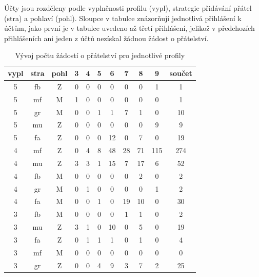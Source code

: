 \documentclass[thesis=M,czech]{FITthesis}[2013/05/10]
\begin{document}
\begin{table}[h]
	\centering
	\caption{Vývoj počtu žádostí o přátelství pro jednotlivé profily}\label{tab:friendRequestsCount}
	Účty jsou rozděleny podle vyplněnosti profilu (vypl), strategie přidávání přátel (stra) a pohlaví (pohl). Sloupce v tabulce znázorňují jednotlivá přihlášení k účtům, jako první je v tabulce uvedeno až třetí přihlášení, jelikož v předchozích přihlášeních ani jeden z účtů nezískal žádnou žádost o přátelství.
	
    \begin{tabular}{ccc | ccccccc | c}
    \textbf{vypl} & \textbf{stra} & \textbf{pohl} & \textbf{3} & \textbf{4} & \textbf{5} & \textbf{6} & \textbf{7} & \textbf{8} & \textbf{9} & \textbf{součet} \\ \hline
    5          & fb        & Z       & 0   & 0   & 0   & 0   & 0   & 0   & 1   & 1   \\
    5          & mf        & M       & 1   & 0   & 0   & 0   & 0   & 0   & 0   & 1   \\
    5          & gr        & M       & 0   & 0   & 1   & 1   & 7   & 1   & 0   & 10  \\
    5          & mu        & Z       & 0   & 0   & 0   & 0   & 0   & 0   & 9   & 9   \\
    5          & fa        & Z       & 0   & 0   & 0   & 12  & 0   & 7   & 0   & 19  \\
    4          & mf        & Z       & 0   & 4   & 8   & 48  & 28  & 71  & 115 & 274 \\
    4          & mu        & Z       & 3   & 3   & 1   & 15  & 7   & 17  & 6   & 52  \\
    4          & fb        & M       & 0   & 0   & 0   & 0   & 0   & 2   & 0   & 2   \\
    4          & gr        & M       & 0   & 1   & 0   & 0   & 0   & 0   & 1   & 2   \\
    4          & fa        & M       & 0   & 0   & 1   & 0   & 19  & 10  & 0   & 30  \\
    3          & fb        & M       & 0   & 0   & 0   & 0   & 1   & 1   & 0   & 2   \\
    3          & mu        & Z       & 3   & 1   & 0   & 10  & 0   & 5   & 0   & 19  \\
    3          & fa        & Z       & 0   & 1   & 1   & 1   & 0   & 1   & 0   & 4   \\
    3          & mf        & M       & 0   & 0   & 0   & 0   & 0   & 0   & 0   & 0   \\
    3          & gr        & Z       & 0   & 0   & 4   & 9   & 3   & 7   & 2   & 25  \\

\end{tabular}
\end{table}
\end{document}
